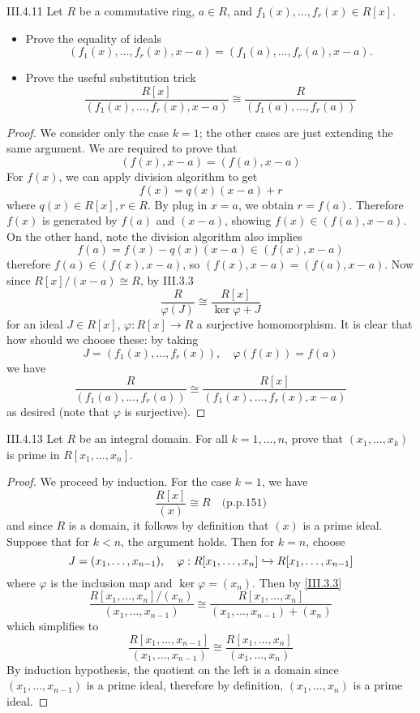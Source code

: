 \begin{problem}{III.4.11}
Let $R$ be a commutative ring, $a \in R$, and $f_1(x),\dotsc,f_r(x) \in R[x]$.
\begin{itemize}
\setlength\itemsep{0pt}
\item Prove the equality of ideals
\[
(f_1(x),\dotsc,f_r(x),x-a) = (f_1(a),\dotsc,f_r(a),x-a).
\]
\item Prove the useful substitution trick
\[
\frac{R[x]}{(f_1(x),\dotsc,f_r(x),x-a)} \cong \frac{R}{(f_1(a),\dotsc,f_r(a))}
\]
\end{itemize}
\end{problem}
\begin{proof}
We consider only the case $k = 1$; the other cases are just extending the same argument. We are required to prove that
\[
(f(x), x-a) = (f(a), x-a)
\]
For $f(x)$, we can apply division algorithm to get
\[
f(x) = q(x)(x-a) + r
\]
where $q(x) \in R[x], r \in R$. By plug in $x = a$, we obtain $r = f(a)$. Therefore $f(x)$ is generated by $f(a)$ and $(x-a)$, showing $f(x)\in (f(a), x-a)$. On the other hand, note the division algorithm also implies
\[
f(a) = f(x) - q(x)(x-a) \in (f(x), x-a)
\]
therefore $f(a) \in (f(x), x-a)$, so $(f(x), x-a) = (f(a), x-a)$. Now since $R[x]/(x-a) \cong R$, by III.3.3
\[
\frac{R}{\varphi(J)} \cong \frac{R[x]}{\ker \varphi + J}
\]
for an ideal $J \in R[x]$, $\varphi : R[x] \to R$ a surjective homomorphism. It is clear that how should we choose these: by taking
\[
J = (f_1(x),\dotsc,f_r(x)), \quad \varphi(f(x)) = f(a)
\]
we have
\[
\frac{R}{(f_1(a),\dotsc,f_r(a))} \cong \frac{R[x]}{(f_1(x),\dotsc,f_r(x),x-a)}
\]
as desired (note that $\varphi$ is surjective).
\end{proof}

\begin{problem}{III.4.13}
Let $R$ be an integral domain. For all $k = 1,\dotsc, n$, prove that $(x_1,\dotsc, x_k)$ is prime in $R[x_1,\dotsc, x_n]$.
\end{problem}
\begin{proof}
We proceed by induction. For the case $k = 1$, we have
\[
\frac{R[x]}{(x)} \cong R	\quad \text{(p.p.151)}
\]
and since $R$ is a domain, it follows by definition that $(x)$ is a prime ideal. Suppose that for $k < n$, the argument holds. Then for $k = n$, choose
\[
J = (x_1,\dotsc,x_{n-1}), \quad \varphi : R[x_1,\dotsc,x_{n}] \xhookrightarrow{} R[x_1,\dotsc,x_{n-1}]
\]
where $\varphi$ is the inclusion map and $\ker \varphi = (x_n)$. Then by \ref{III.3.3}
\[
\frac{R[x_1,\dotsc,x_{n}]/(x_n)}{(x_1,\dotsc,x_{n-1})} \cong \frac{R[x_1,\dotsc,x_{n}]}{(x_1,\dotsc,x_{n-1})+(x_n)}
\]
which simplifies to
\[
\frac{R[x_1,\dotsc,x_{n-1}]}{(x_1,\dotsc,x_{n-1})} \cong \frac{R[x_1,\dotsc,x_{n}]}{(x_1,\dotsc,x_n)}
\]
By induction hypothesis, the quotient on the left is a domain since $(x_1,\dotsc,x_{n-1})$ is a prime ideal, therefore by definition, $(x_1,\dotsc,x_n)$ is a prime ideal.
\end{proof}


